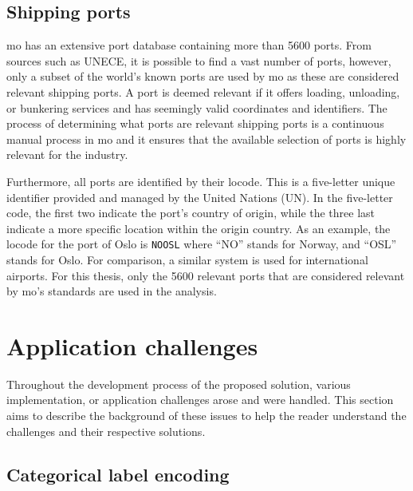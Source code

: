 \subsection{Shipping ports}
\label{sec:shipping_ports}

\acrshort{mo} has an extensive port database containing more than 5600 ports. From sources such as UNECE, it is possible to find a vast number of ports, however, only a subset of the world's known ports are used by \acrshort{mo} as these are considered relevant shipping ports. A port is deemed relevant if it offers loading, unloading, or bunkering services and has seemingly valid coordinates and identifiers. The process of determining what ports are relevant shipping ports is a continuous manual process in \acrshort{mo} and it ensures that the available selection of ports is highly relevant for the industry.

Furthermore, all ports are identified by their \gls{locode}. This is a five-letter unique identifier provided and managed by the United Nations (UN). In the five-letter code, the first two indicate the port's country of origin, while the three last indicate a more specific location within the origin country. As an example, the \gls{locode} for the port of Oslo is \texttt{NOOSL} where ``NO'' stands for Norway, and ``OSL'' stands for Oslo. For comparison, a similar system is used for international airports. For this thesis, only the 5600 relevant ports that are considered relevant by \acrshort{mo}'s standards are used in the analysis.

\section{Application challenges}

Throughout the development process of the proposed solution, various implementation, or application challenges arose and were handled. This section aims to describe the background of these issues to help the reader understand the challenges and their respective solutions.

\subsection{Categorical label encoding}
\label{sec:label_encoding}

